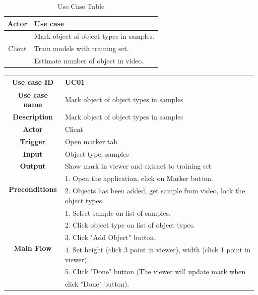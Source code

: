 \begin{table}[H]
\begin{center}
  \begin{tabular}{ | c | l | } 
  \hline
  \textbf{Actor} & \textbf{Use case} \\
  \hline
  \multirow{3}{4em}{Client} & Mark object of object types in samples. \\
  &Train models with training set. \\
  &Estimate number of object in video. \\
  \hline
  \end{tabular}
  
\end{center}
\caption{Use Case Table}\label{tab:usecase}
\end{table}

\begin{table}[H]
  \begin{center}
    \begin{tabular}{ | c | l | } 
    \hline
    \textbf{Use case ID} & UC01 \\
    \hline
    \textbf{Use case name} & Mark object of object types in samples \\
    \hline
    \textbf{Description} & Mark object of object types in samples\\
    \hline
    \textbf{Actor} & Client \\
    \hline
    \textbf{Trigger} & Open marker tab \\
    \hline
    \textbf{Input} & Object type, samples \\
    \hline
    \textbf{Output} & Show mark in viewer and extract to training set \\
    \hline    
    \multirow{2}{4em}{\textbf{Preconditions}} & 1. Open the application, click on Marker button. \\ 
    & 2. Objects has been added, get sample from video, lock the object types. \\
    \hline
    \multirow{16}{4em}{\textbf{Main Flow}}  & 1. Select sample on list of samples.\\
    & 2. Click object type on list of object types. \\
    & 3. Click "Add Object" button. \\ 
    & 4. Set height (click 3 point in viewer), width (click 1 point in viewer). \\
    & 5. Click "Done" button (The viewer will update mark when \\
    & click "Done" button). \\

\end{tabular}
\end{center}
\end{table}
